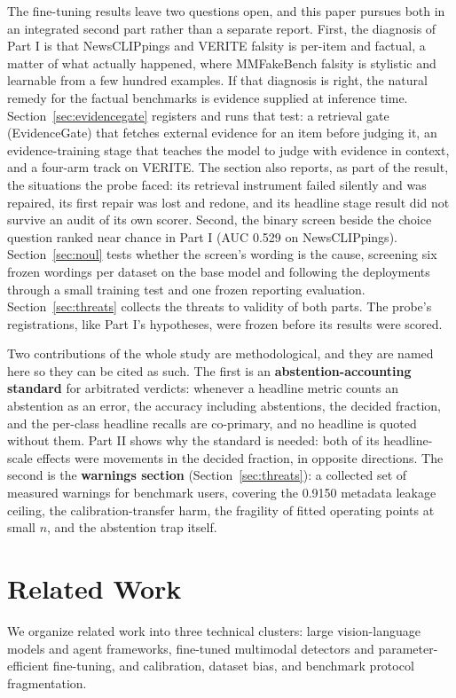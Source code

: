 \documentclass{article} %
\begin{document}
The fine-tuning results leave two questions open, and this paper pursues both in an integrated second part rather than a separate report. First, the diagnosis of Part I is that NewsCLIPpings and VERITE falsity is per-item and factual, a matter of what actually happened, where MMFakeBench falsity is stylistic and learnable from a few hundred examples. If that diagnosis is right, the natural remedy for the factual benchmarks is evidence supplied at inference time. Section~\ref{sec:evidencegate} registers and runs that test: a retrieval gate (EvidenceGate) that fetches external evidence for an item before judging it, an evidence-training stage that teaches the model to judge with evidence in context, and a four-arm track on VERITE. The section also reports, as part of the result, the situations the probe faced: its retrieval instrument failed silently and was repaired, its first repair was lost and redone, and its headline stage result did not survive an audit of its own scorer. Second, the binary screen beside the choice question ranked near chance in Part I (AUC 0.529 on NewsCLIPpings). Section~\ref{sec:noul} tests whether the screen's wording is the cause, screening six frozen wordings per dataset on the base model and following the deployments through a small training test and one frozen reporting evaluation. Section~\ref{sec:threats} collects the threats to validity of both parts. The probe's registrations, like Part I's hypotheses, were frozen before its results were scored.

Two contributions of the whole study are methodological, and they are named here so they can be cited as such. The first is an \textbf{abstention-accounting standard} for arbitrated verdicts: whenever a headline metric counts an abstention as an error, the accuracy including abstentions, the decided fraction, and the per-class headline recalls are co-primary, and no headline is quoted without them. Part II shows why the standard is needed: both of its headline-scale effects were movements in the decided fraction, in opposite directions. The second is the \textbf{warnings section} (Section~\ref{sec:threats}): a collected set of measured warnings for benchmark users, covering the 0.9150 metadata leakage ceiling, the calibration-transfer harm, the fragility of fitted operating points at small \(n\), and the abstention trap itself.

\section{Related Work}
\label{sec:related_work}
We organize related work into three technical clusters: large vision-language models and agent frameworks, fine-tuned multimodal detectors and parameter-efficient fine-tuning, and calibration, dataset bias, and benchmark protocol fragmentation.
\end{document}
